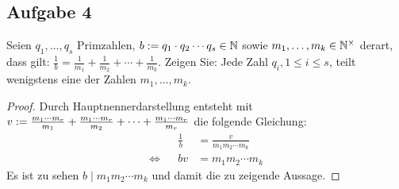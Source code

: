 \subsection{Aufgabe 4}
Seien $q_1,\dotsc,q_s$ Primzahlen, $b := q_1 \cdot q_2 \dotsm q_s \in \mathbb{N}$
sowie $m_1,\dotsc,m_k \in \mathbb{N}^\times$ derart, dass gilt:
$\frac{1}{b} = \frac{1}{m_1} + \frac{1}{m_2} + \dotsb + \frac{1}{m_k}$.
Zeigen Sie: Jede Zahl $q_i, 1 \leq i \leq s$, teilt wenigstens eine der Zahlen $m_1,\dotsc,m_k$.
\begin{proof}
  Durch Hauptnennerdarstellung entsteht mit $v := \frac{m_1 \dotsm m_r}{m_1} +
    \frac{m_1 \dotsm m_r}{m_2} + \dotsb + \frac{m_1 \dotsm m_r}{m_r}$
  die folgende Gleichung:
  \begin{equation*}
    \begin{aligned}
           &  & \frac{1}{b} & = \frac{v}{m_1m_2 \dotsm m_k} \\
      \iff &  & bv          & = m_1m_2 \dotsm m_k
    \end{aligned}
  \end{equation*}
  Es ist zu sehen $b \mid m_1m_2 \dotsm m_k$ und damit die zu zeigende Aussage.
\end{proof}

